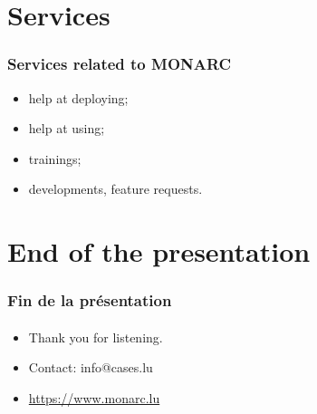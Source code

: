 \documentclass[]{beamer}
\begin{document}
\section*{Services}
\begin{frame}
    \frametitle{Services related to MONARC}
    \begin{center}
        \begin{itemize}
            \item help at deploying;
            \item help at using;
            \item trainings;
            \item developments, feature requests.
        \end{itemize}
    \end{center}
\end{frame}




%
%
\section*{End of the presentation}
\begin{frame}
    \frametitle{Fin de la présentation}
    \framesubtitle{}
    \begin{center}
        \begin{itemize}
            \item Thank you for listening.
            \item Contact: info@cases.lu
            \item \url{https://www.monarc.lu}
        \end{itemize}
    \end{center}
\end{frame}
\end{document}
